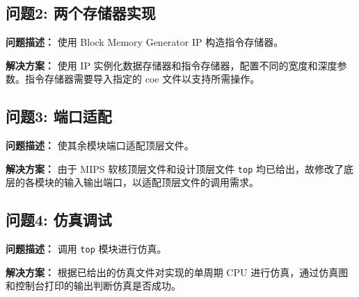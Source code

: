 \subsection{问题2: 两个存储器实现}
\textbf{问题描述：} 使用 Block Memory Generator IP 构造指令存储器。

\textbf{解决方案：} 使用 IP 实例化数据存储器和指令存储器，配置不同的宽度和深度参数。指令存储器需要导入指定的 coe 文件以支持所需操作。

\subsection{问题3: 端口适配}
\textbf{问题描述：} 使其余模块端口适配顶层文件。

\textbf{解决方案：} 由于 MIPS 软核顶层文件和设计顶层文件 \texttt{top} 均已给出，故修改了底层的各模块的输入输出端口，以适配顶层文件的调用需求。

\subsection{问题4: 仿真调试}
\textbf{问题描述：} 调用 \texttt{top} 模块进行仿真。

\textbf{解决方案：} 根据已给出的仿真文件对实现的单周期 CPU 进行仿真，通过仿真图和控制台打印的输出判断仿真是否成功。

